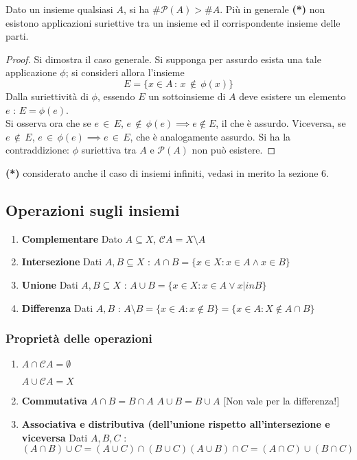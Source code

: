 \documentclass[10pt]{article}
\theoremstyle{plain}
\begin{document}
\begin{ther}
Dato un insieme qualsiasi $A$, si ha $\#\mathcal{P}(A) > \# A$. Più in generale \textbf{(*)} non esistono applicazioni suriettive tra un insieme ed il corrispondente insieme delle parti.
\end{ther}
\begin{proof}
Si dimostra il caso generale. Si supponga per assurdo esista una tale applicazione $\phi$; si consideri allora l'insieme
\[E = \{x \in A \, : \, x \, \notin \, \phi(x)\}\]
Dalla suriettività di $\phi$, essendo $E$ un sottoinsieme di $A$ deve esistere un elemento $e$ : $E = \phi(e)$.
\\Si osserva ora che se $e \, \in \, E$, $e \, \notin \, \phi(e) \implies e \notin E$, il che è assurdo. Viceversa, se $e \, \notin \, E$, $e \, \in \, \phi(e) \implies e \, \in \, E$, che è analogamente assurdo. Si ha la contraddizione: $\phi$ suriettiva tra $A$ e $\mathcal{P}(A)$ non può esistere.
\end{proof}


\textbf{(*)} considerato anche il caso di insiemi infiniti, vedasi in merito la sezione 6.

\subsection{Operazioni sugli insiemi}

\begin{enumerate}
\item \textbf{Complementare} Dato $A \subseteq X$, $\mathcal{C}A = X \setminus A$
\item \textbf{Intersezione} Dati $A, B \subseteq X$ : $A \cap B = \{x \in X : x \in A \land x \in B\}$
\item \textbf{Unione} Dati $A, B \subseteq X$ : $A \cup B = \{x \in X : x \in A \lor x |in B\}$
\item \textbf{Differenza} Dati $A, B$ : $A \setminus B = \{x \in A : x \notin B\} = \{x \in A : X \notin A \cap B \}$
\end{enumerate}
\subsubsection{Proprietà delle operazioni}
\begin{enumerate}
\item \hypertarget{nullo}{$A \cap \mathcal{C}A = \emptyset$}  $A \cup \mathcal{C}A = X$
\item \textbf{Commutativa} $A \cap B = B \cap A$  $A \cup B = B \cup A$ [Non vale per la differenza!]
\item \textbf{Associativa e distributiva (dell'unione rispetto all'intersezione e viceversa} Dati $A, B, C$ : \[(A \cap B) \cup C = (A \cup C) \cap (B \cup C) {   } (A \cup B) \cap C = (A \cap C) \cup (B \cap C)\]
\end{enumerate}
\end{document}
